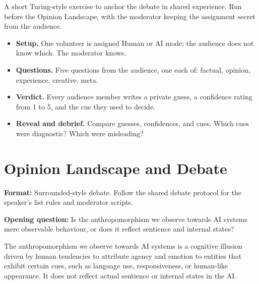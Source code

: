 \noindent A short Turing-style exercise to anchor the debate in shared
experience. Run before the Opinion Landscape, with the moderator
keeping the assignment secret from the audience.%

\begin{itemize}
    \item \textbf{Setup.} One volunteer is assigned Human or AI mode;
    the audience does not know which. The moderator knows.
    \item \textbf{Questions.} Five questions from the audience, one
    each of: factual, opinion, experience, creative, meta.
    \item \textbf{Verdict.} Every audience member writes a private
    guess, a confidence rating from 1 to 5, and the cue they used to
    decide.
    \item \textbf{Reveal and debrief.} Compare guesses, confidences,
    and cues. Which cues were diagnostic? Which were misleading?
\end{itemize}

\section*{Opinion Landscape and Debate}

\noindent \textbf{Format:} Surrounded-style debate. Follow the shared
debate protocol for the speaker's list rules and moderator scripts.

\medskip
\noindent \textbf{Opening question:} Is the anthropomorphism we observe
towards AI systems mere observable behaviour, or does it reflect sentience
and internal states?

\quad The anthropomorphism we
observe towards AI systems is a cognitive illusion driven by human
tendencies to attribute agency and emotion to entities that exhibit certain
cues, such as language use, responsiveness, or human-like appearance. It
does not reflect actual sentience or internal states in the AI.

\vspace{1.5em}


